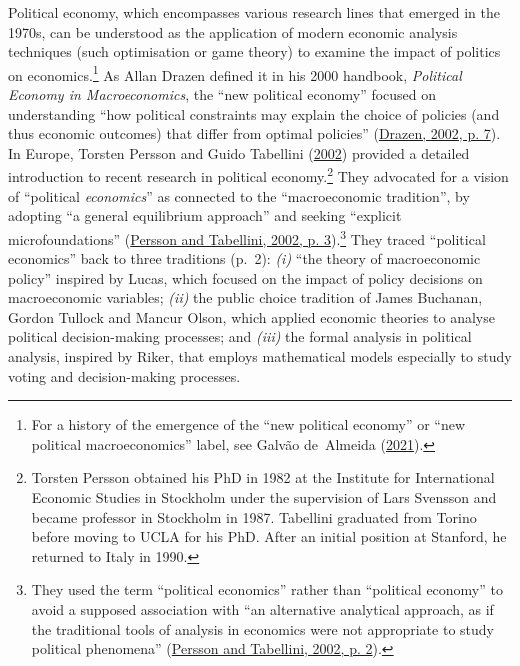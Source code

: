 \documentclass[
  12pt,
  onecolumn]{article}
\begin{document}
Political economy, which encompasses various research lines that emerged
in the 1970s, can be understood as the application of modern economic
analysis techniques (such optimisation or game theory) to examine the
impact of politics on economics.\footnote{For a history of the emergence
  of the ``new political economy'' or ``new political macroeconomics''
  label, see Galvão de~Almeida
  (\protect\hyperlink{ref-galvaodealmeida2021}{2021}).} As Allan Drazen
defined it in his 2000 handbook, \emph{Political Economy in
Macroeconomics}, the ``new political economy'' focused on understanding
``how political constraints may explain the choice of policies (and thus
economic outcomes) that differ from optimal policies''
(\protect\hyperlink{ref-drazen2002}{Drazen, 2002, p. 7}). In Europe,
Torsten Persson and Guido Tabellini
(\protect\hyperlink{ref-persson2002}{2002}) provided a detailed
introduction to recent research in political economy.\footnote{Torsten
  Persson obtained his PhD in 1982 at the Institute for International
  Economic Studies in Stockholm under the supervision of Lars Svensson
  and became professor in Stockholm in 1987. Tabellini graduated from
  Torino before moving to UCLA for his PhD. After an initial position at
  Stanford, he returned to Italy in 1990.} They advocated for a vision
of ``political \emph{economics}'' as connected to the ``macroeconomic
tradition'', by adopting ``a general equilibrium approach'' and seeking
``explicit microfoundations''
(\protect\hyperlink{ref-persson2002}{Persson and Tabellini, 2002, p.
3}).\footnote{They used the term ``political economics'' rather than
  ``political economy'' to avoid a supposed association with ``an
  alternative analytical approach, as if the traditional tools of
  analysis in economics were not appropriate to study political
  phenomena'' (\protect\hyperlink{ref-persson2002}{Persson and
  Tabellini, 2002, p. 2}).} They traced ``political economics'' back to
three traditions (p.~2): \emph{(i)} ``the theory of macroeconomic
policy'' inspired by Lucas, which focused on the impact of policy
decisions on macroeconomic variables; \emph{(ii)} the public choice
tradition of James Buchanan, Gordon Tullock and Mancur Olson, which
applied economic theories to analyse political decision-making
processes; and \emph{(iii)} the formal analysis in political analysis,
inspired by Riker, that employs mathematical models especially to study
voting and decision-making processes.
\end{document}

